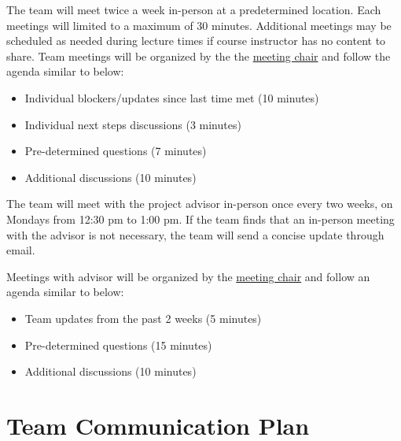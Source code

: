 \documentclass{article}
\begin{document}
The team will meet twice a week in-person at a predetermined location. Each
meetings will limited to a maximum of 30 minutes. Additional meetings may be
scheduled as needed during lecture times if course instructor has no content to
share. Team meetings will be organized by the the
\hyperref[role:meeting_chair]{meeting chair} and follow the agenda similar to
below:

\begin{itemize}
  \item Individual blockers/updates since last time met (10 minutes)
  \item Individual next steps discussions (3 minutes)
  \item Pre-determined questions (7 minutes)
  \item Additional discussions (10 minutes)
\end{itemize}

The team will meet with the project advisor in-person once every two weeks, on
Mondays from 12:30 pm to 1:00 pm. If the team finds that an in-person meeting
with the advisor is not necessary, the team will send a concise update through
email.

Meetings with advisor will be organized by the
\hyperref[role:meeting_chair]{meeting chair} and follow an agenda similar to
below:

\begin{itemize}
  \item Team updates from the past 2 weeks (5 minutes)
  \item Pre-determined questions (15 minutes)
  \item Additional discussions (10 minutes)
\end{itemize}

\section{Team Communication Plan}
\end{document}
